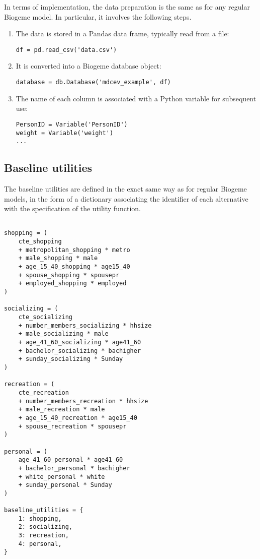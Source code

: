 \documentclass[12pt,a4paper]{article}
\begin{document}
In terms of implementation, the data preparation is the same as for any regular Biogeme model. In particular,
it involves the following steps.
\begin{enumerate}
    \item The data is stored in a Pandas data frame, typically read from a file:
\begin{lstlisting}
df = pd.read_csv('data.csv')
\end{lstlisting}
\item It is converted into a Biogeme database object:
\begin{lstlisting}
database = db.Database('mdcev_example', df)
\end{lstlisting}
\item The name of each column is associated with a Python variable for subsequent use:
\begin{lstlisting}
PersonID = Variable('PersonID')
weight = Variable('weight')
...
\end{lstlisting}
\end{enumerate}

\subsection{Baseline utilities}

The baseline utilities are defined in the exact same way as for regular Biogeme models, in the form of a dictionary associating
the identifier of each alternative with the specification of the utility function.

\begin{lstlisting}

shopping = (
    cte_shopping
    + metropolitan_shopping * metro
    + male_shopping * male
    + age_15_40_shopping * age15_40
    + spouse_shopping * spousepr
    + employed_shopping * employed
)

socializing = (
    cte_socializing
    + number_members_socializing * hhsize
    + male_socializing * male
    + age_41_60_socializing * age41_60
    + bachelor_socializing * bachigher
    + sunday_socializing * Sunday
)

recreation = (
    cte_recreation
    + number_members_recreation * hhsize
    + male_recreation * male
    + age_15_40_recreation * age15_40
    + spouse_recreation * spousepr
)

personal = (
    age_41_60_personal * age41_60
    + bachelor_personal * bachigher
    + white_personal * white
    + sunday_personal * Sunday
)

baseline_utilities = {
    1: shopping,
    2: socializing,
    3: recreation,
    4: personal,
}
\end{lstlisting}
\end{document}

